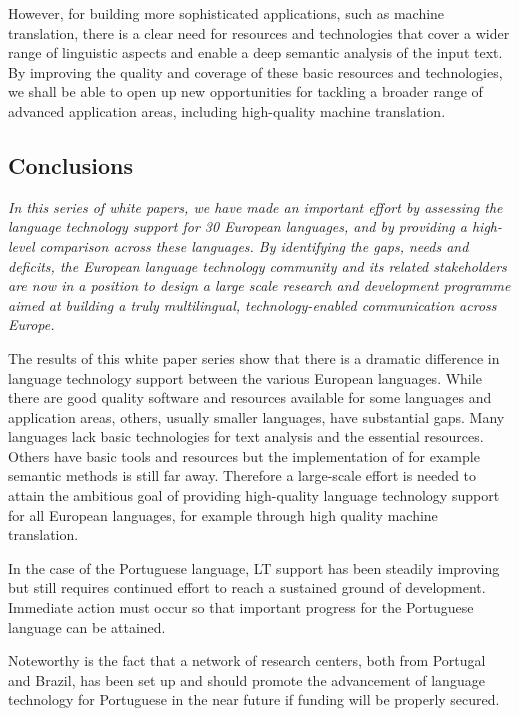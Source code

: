 \begin{multicols}{2}
However, for building more sophisticated applications, such as machine translation, there is a clear need for resources and technologies that cover a wider range of linguistic aspects and enable a deep semantic analysis of the input text. By improving the quality and coverage of these basic resources and technologies, we shall be able to open up new opportunities for tackling a broader range of advanced application areas, including high-quality machine translation.

\subsection{Conclusions}

\emph{In this series of white papers, we have made an important effort by assessing the language technology support for 30 European languages, and by providing a high-level comparison across these languages. By identifying the gaps, needs and deficits, the European language technology community and its related stakeholders are now in a position to design a large scale research and development programme aimed at building a truly multilingual, technology-enabled communication across Europe.}

The results of this white paper series show that there is a dramatic difference in language technology support between the various European languages. While there are good quality software and resources available for some languages and application areas, others, usually smaller languages, have substantial gaps. Many languages lack basic technologies for text analysis and the essential resources. Others have basic tools and resources but the implementation of for example semantic methods is still far away. Therefore a large-scale effort is needed to attain the ambitious goal of providing high-quality language technology support for all European languages, for example through high quality machine translation. 

   In the case of the Portuguese language, LT support has been steadily improving but still requires continued effort to reach a sustained ground of development. Immediate action must occur so that important progress for the Portuguese language can be attained.

  Noteworthy is the fact that a network of research centers, both from Portugal and Brazil, has been set up and should promote the advancement of language technology for Portuguese in the near future if funding will be properly secured.


\end{multicols}
